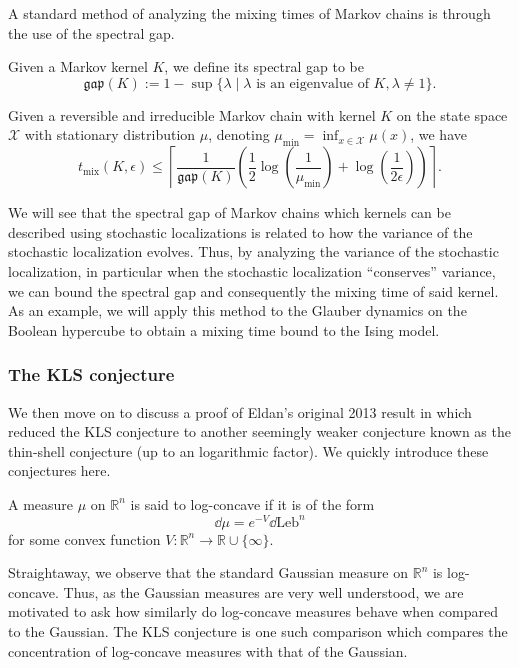 A standard method of analyzing the mixing times of Markov chains is through the use of the spectral gap. 

\begin{definition}
  Given a Markov kernel \(K\), we define its spectral gap to be 
  \[\mathfrak{gap}(K) := 1 - \sup\{\lambda \mid \lambda \text{ is an eigenvalue of } K, \lambda \neq 1\}.\]
\end{definition}

\begin{theorem}\label{thm:levin}
  Given a reversible and irreducible Markov chain with kernel \(K\) on the state space \(\mathcal{X}\) 
  with stationary distribution \(\mu\), denoting \(\mu_{\min} = \inf_{x \in \mathcal{X}} \mu(x)\), we have 
  \[t_{\text{mix}}(K, \epsilon) \le \left\lceil\frac{1}{\mathfrak{gap}(K)}
  \left(\frac{1}{2}\log\left(\frac{1}{\mu_{\min}}\right) + \log\left(\frac{1}{2\epsilon}\right)\right)\right\rceil.\]
\end{theorem}

We will see that the spectral gap of Markov chains which kernels can be described using stochastic localizations 
is related to how the variance of the stochastic localization evolves. Thus, by analyzing the variance of 
the stochastic localization, in particular when the stochastic localization ``conserves'' variance, we can 
bound the spectral gap and consequently the mixing time of said kernel. As an example, we will apply this 
method to the Glauber dynamics on the Boolean hypercube to obtain a mixing time bound to the Ising model. 

\subsubsection{The KLS conjecture}

We then move on to discuss a proof of Eldan's original 2013 result in \cite{Eldan_2013} which reduced 
the KLS conjecture to another seemingly weaker conjecture known as the thin-shell conjecture (up to an logarithmic factor). 
We quickly introduce these conjectures here.

\begin{definition}
  A measure \(\mu\) on \(\mathbb{R}^n\) is said to log-concave if it is of the form 
  \[\dd \mu = e^{-V}\dd\text{Leb}^n\] 
  for some convex function \(V : \mathbb{R}^n \to \mathbb{R} \cup \{\infty\}\).
\end{definition}

Straightaway, we observe that the standard Gaussian measure on \(\mathbb{R}^n\) is log-concave.
Thus, as the Gaussian measures are very well understood, we are motivated to ask how similarly do log-concave 
measures behave when compared to the Gaussian. The KLS conjecture is one such comparison which compares the 
concentration of log-concave measures with that of the Gaussian.

